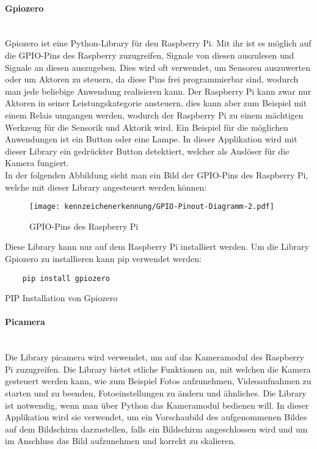 \paragraph{Gpiozero}\mbox{}\\
Gpiozero ist eine Python-Library für den Raspberry Pi. Mit ihr ist es möglich auf die GPIO-Pins des Raspberry zuzugreifen, Signale von diesen 
auszulesen und Signale an diesen auszugeben. Dies wird oft verwendet, um Sensoren auszuwerten oder um Aktoren zu steuern, da diese Pins frei 
programmierbar sind, wodurch man jede beliebige Anwendung realisieren kann. Der Raspberry Pi kann zwar nur Aktoren in seiner Leistungskategorie ansteuern, 
dies kann aber zum Beispiel mit einem Relais umgangen werden, wodurch der Raspberry Pi zu einem mächtigen Werkzeug für die Sensorik und Aktorik wird. 
Ein Beispiel für die möglichen Anwendungen ist ein Button oder eine Lampe. In dieser Applikation wird mit dieser Library ein gedrückter Button detektiert, 
welcher als Auslöser für die Kamera fungiert.\\

In der folgenden Abbildung sieht man ein Bild der GPIO-Pins des Raspberry Pi, welche mit dieser Library angesteuert werden können:

\begin{figure}[H]
    \centering
    \texttt{[image: kennzeichenerkennung/GPIO-Pinout-Diagramm-2.pdf]}
    \caption{GPIO-Pins des Raspberry Pi}
\end{figure}

Diese Library kann nur auf dem Raspberry Pi installiert werden. Um die Library Gpiozero zu installieren kann pip verwendet werden:

\begin{listing}[H]
    \begin{verbatim}
    pip install gpiozero
    \end{verbatim}
    \caption{PIP Installation von Gpiozero}
\end{listing}

\paragraph{Picamera}\mbox{}\\
Die Library picamera wird verwendet, um auf das Kameramodul des Raspberry Pi zuzugreifen. Die Library bietet etliche Funktionen an, 
mit welchen die Kamera gesteuert werden kann, wie zum Beispiel Fotos aufzunehmen, Videoaufnahmen zu starten und zu beenden, Fotoeinstellungen 
zu ändern und ähnliches. Die Library ist notwendig, wenn man über Python das Kameramodul bedienen will. In dieser Applikation wird sie verwendet, 
um ein Vorschaubild des aufgenommenen Bildes auf dem Bildschirm darzustellen, falls ein Bildschirm angeschlossen wird und um im 
Anschluss das Bild aufzunehmen und korrekt zu skalieren.\\

